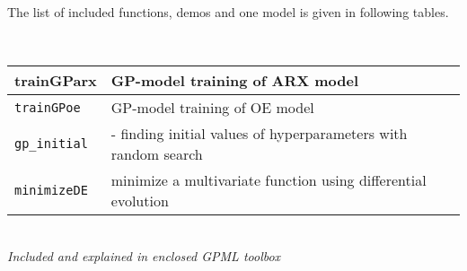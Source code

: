 \documentclass[12pt,twoside]{article}
\newcommand{\fun}[1]{\tt #1}
\begin{document}
\clearpage

 The list of included functions, demos and one model is given in
 following tables.


{\renewcommand{\arraystretch}{1.1}

 \\
\begin{tabular}{|l|l|}
 \hline trainGParx & GP-model training of ARX model \\
 \hline \fun{trainGPoe} & GP-model training of OE model \\
 \hline \fun{gp\_initial} & - finding initial values of hyperparameters with random search  \\
  \hline \fun{minimizeDE} & minimize a multivariate function using differential evolution \\
  \hline
\end{tabular}

 \\
{\it Included and explained in enclosed GPML toolbox}

}
\end{document}
